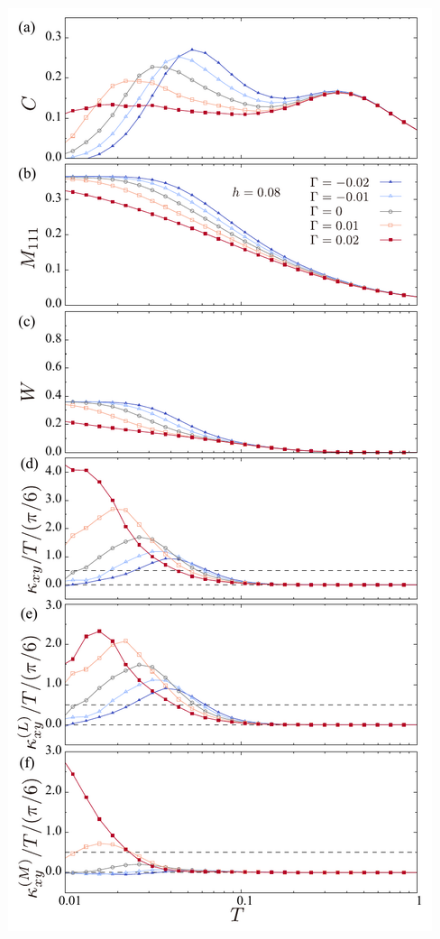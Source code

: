 \documentclass[twocolumn,superscriptaddress,showpacs, longbibliography, aps, prb]{revtex4-2}
\newcommand{\red}[1]{\textcolor{red}{#1}}
\newcommand{\blue}[1]{\textcolor{blue}{#1}}
\begin{document}
\begin{figure}
{  %
  }
  \label{fig:all_h0.04_G}
\end{figure}
\begin{figure}
  \begin{center}
    \includegraphics[width=0.9\linewidth]{Figs/plot_all_h0.08_G.pdf}

\end{center}
\end{figure}
\end{document}

